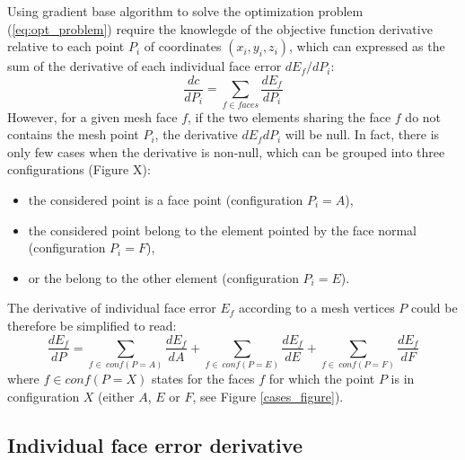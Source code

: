 \documentclass[11pt]{article}
\begin{document}
Using gradient base algorithm to solve the optimization problem (\ref{eq:opt_problem}) require the knowlegde of the objective function derivative relative to each point $P_i$ of coordinates $(x_i,y_i,z_i)$, which can expressed as the sum of the derivative of each individual face error $d E_f / dP_i$:
%
\begin{equation}
\frac{dc}{dP_i} = \sum_{f \in faces} \frac{d E_f}{d P_i}
\end{equation}
%
However, for a given mesh face $f$, if the two elements sharing the face $f$ do not contains the mesh point $P_i$, the derivative ${d E_f}{d P_i}$ will be null.
In fact, there is only few cases when the derivative is non-null, which can be grouped into three configurations (Figure X):
\begin{itemize}
\item the considered point is a face point (configuration $P_i = A$),
\item the considered point belong to the element pointed by the face normal (configuration $P_i = F$),
\item or the belong to the other element (configuration $P_i = E$).
\end{itemize}
%
The derivative of individual face error $E_f$ according to a mesh vertices $P$ could be therefore be simplified to read:
%
\begin{equation}
\frac{dE_f}{dP} = \sum_{f\in\ conf(P=A)} \frac{dE_f}{dA} + \sum_{f\in\ conf(P=E)} \frac{dE_f}{dE} +
\sum_{f\in\ conf(P=F)} \frac{dE_f}{dF} 
\end{equation}
%
where $f \in conf(P=X)$ states for the faces $f$ for which the point $P$ is in configuration $X$ (either $A$, $E$ or $F$, see Figure \ref{cases_figure}). 


\subsection{Individual face error derivative}
\end{document}
